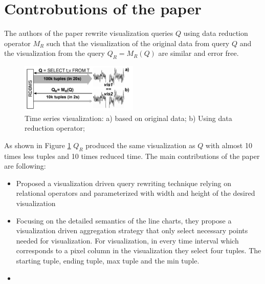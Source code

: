 \section{Controbutions of the paper}
The authors of the paper rewrite visualization queries $Q$ using data reduction operator 
$M_R$ such that the visualization of the original data from query $Q$ and the visualization 
from the query $Q_R = M_R(Q)$ are similar and error free. 
\begin{figure}[h]
	\includegraphics[width=0.5\textwidth]{qr}
	\caption{Time series visualization: a) based on original data; b) Using data reduction operator;}   
	\label{fig:1}
\end{figure}
As shown in Figure \ref{fig:1} $Q_R$ produced the same visualization as $Q$ with almost 10 times less tuples and 10 times reduced time. 
The main contributions of the paper are following:
\begin{itemize}
	\item Proposed a visualization driven query rewriting technique relying on relational operators and parameterized with width and height of the desired visualization
	\item Focusing on the detailed semantics of the line charts, they propose a visualization driven aggregation strategy that only select necessary points needed for visualization. For visualization, in every time interval which corresponds to a pixel column in the visualization they select four tuples. The starting tuple, ending tuple, max tuple and the min tuple. 
	\item 
\end{itemize}




